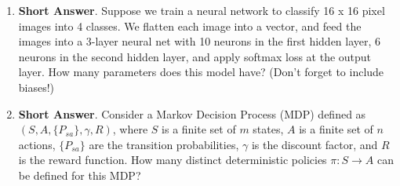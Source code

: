 \documentclass{article}
\newif\ifsolutions
\newenvironment{labelledanswer}{{\bf Answer:} \sf }{}%
\newcommand{\answer}[2]
{{
\ifsolutions
\begin{labelledanswer}
\color{red} 
#2
\end{labelledanswer}
\else
#1
\fi
}}
\begin{document}
\begin{enumerate}
\item \textbf{Short Answer}.
Suppose we train a neural network to classify 16 x 16 pixel images into 4 classes. We flatten each image into a vector, and feed the images into a 3-layer neural net with 10 neurons in the first hidden layer, 6 neurons in the second hidden layer, and apply softmax loss at the output layer. How many parameters does this model have? (Don't forget to include biases!)

\answer{}{
For the first layer, the number of params = $(10 \times (16 \times 16)) + 10 = (10 \times 256) + 10$.\\
For the second layer, the number of params = $(6 \times 10) + 6$.\\
For the third layer, the number of params = $(4 \times 6) + 4$.\\
The model has 2664 parameters in total.\\\
}

\item \textbf{Short Answer}.
Consider a Markov Decision Process (MDP) defined as $(S, A, \{P_{sa}\}, \gamma, R)$, where $S$ is a finite set of $m$ states, $A$ is a finite set of $n$ actions, $\{P_{sa}\}$ are the transition probabilities, $\gamma$ is the discount factor, and $R$ is the reward function.
How many distinct deterministic policies $\pi:S\to A$ can be defined for this MDP?

\answer{}{
We can have up to $n^m$ policies. We have $n$ possible actions and $m$ states, and we can cycle through all $m$ states in the MDP with each state having $n$ possible actions (therefore, $n^m$).
}


\end{enumerate}
\end{document}
